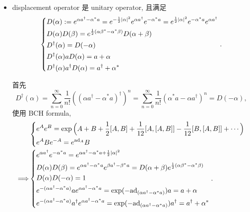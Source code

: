\documentclass[10pt, a4paper]{article}
\numberwithin{equation}{section}
\begin{document}
\begin{itemize}
		\item displacement operator 是 unitary operator, 且满足
		\begin{equation}
			\begin{dcases}
				D(\alpha) := e^{\alpha a^\dag - \alpha^* a} = e^{- \frac{1}{2} |\alpha|^2} e^{\alpha a^\dag} e^{- \alpha^* a} = e^{\frac{1}{2} |\alpha|^2} e^{- \alpha^* a} e^{\alpha a^\dag} \\
				D(\alpha) D(\beta) = e^{\frac{1}{2} (\alpha \beta^* - \alpha^* \beta)} D(\alpha + \beta) \\
				D^\dag(\alpha) = D(- \alpha) \\
				D^\dag(\alpha) a D(\alpha) = a + \alpha \\
				D^\dag(\alpha) a^\dag D(\alpha) = a ^\dag + \alpha^*
			\end{dcases}.
		\end{equation}
		
		\begin{tcolorbox}[title=calculation:]
			首先
			\begin{equation}
				D^\dag(\alpha) = \sum_{n = 0}^\infty \frac{1}{n!} ((\alpha a^\dag - \alpha^* a)^\dag)^n = \sum_{n = 0}^\infty \frac{1}{n!} (\alpha^* a - \alpha a^\dag)^n = D(- \alpha),
			\end{equation}
			使用 BCH formula,
			\begin{align}
				& \begin{dcases}
					e^A e^B = \exp \Big( A + B + \frac{1}{2} [A, B] + \frac{1}{12} [A, [A, B]] - \frac{1}{12} [B, [A, B]] + \cdots \Big) \\
					e^A B e^{- A} = e^{\mathrm{ad}_A} B
				\end{dcases} \notag \\
				\Longrightarrow & \begin{dcases}
					e^{\alpha a^\dag} e^{- \alpha^* a} = e^{\alpha a^\dag - \alpha^* a + \frac{1}{2} |\alpha|^2} \\
					D(\alpha) D(\beta) = e^{\alpha a^\dag - \alpha^* a} e^{\beta a^\dag - \beta^* a} = D(\alpha + \beta) e^{\frac{1}{2} (\alpha \beta^* - \alpha^* \beta)} \\
					D(\alpha) D(- \alpha) = 1 \\
					e^{- (\alpha a^\dag - \alpha^* a)} a e^{\alpha a^\dag - \alpha^* a} = \exp(- \mathrm{ad}_{(\alpha a^\dag - \alpha^* a)}) a = a + \alpha \\
					e^{- (\alpha a^\dag - \alpha^* a)} a^\dag e^{\alpha a^\dag - \alpha^* a} = \exp(- \mathrm{ad}_{(\alpha a^\dag - \alpha^* a)}) a^\dag = a^\dag + \alpha^*
				\end{dcases}.
			\end{align}
		\end{tcolorbox}
		

\end{itemize}
\end{document}
